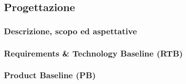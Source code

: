 \subsection{Progettazione}

\subsubsection{Descrizione, scopo ed aspettative}

\subsubsection{Requirements \& Technology Baseline (RTB)}

\subsubsection{Product Baseline (PB)}